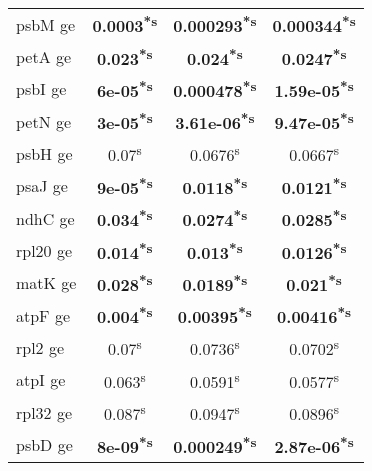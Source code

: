 \documentclass[a4paper]{article}
\begin{document}
\begin{longtable}{l|c|c|c}
psbM ge&\textbf{0.0003\textsuperscript{*}\textsuperscript{s}}&\textbf{0.000293\textsuperscript{*}\textsuperscript{s}}&\textbf{0.000344\textsuperscript{*}\textsuperscript{s}}\\
petA ge&\textbf{0.023\textsuperscript{*}\textsuperscript{s}}&\textbf{0.024\textsuperscript{*}\textsuperscript{s}}&\textbf{0.0247\textsuperscript{*}\textsuperscript{s}}\\
psbI ge&\textbf{6e-05\textsuperscript{*}\textsuperscript{s}}&\textbf{0.000478\textsuperscript{*}\textsuperscript{s}}&\textbf{1.59e-05\textsuperscript{*}\textsuperscript{s}}\\
petN ge&\textbf{3e-05\textsuperscript{*}\textsuperscript{s}}&\textbf{3.61e-06\textsuperscript{*}\textsuperscript{s}}&\textbf{9.47e-05\textsuperscript{*}\textsuperscript{s}}\\
psbH ge&0.07\textsuperscript{s}&0.0676\textsuperscript{s}&0.0667\textsuperscript{s}\\
psaJ ge&\textbf{9e-05\textsuperscript{*}\textsuperscript{s}}&\textbf{0.0118\textsuperscript{*}\textsuperscript{s}}&\textbf{0.0121\textsuperscript{*}\textsuperscript{s}}\\
ndhC ge&\textbf{0.034\textsuperscript{*}\textsuperscript{s}}&\textbf{0.0274\textsuperscript{*}\textsuperscript{s}}&\textbf{0.0285\textsuperscript{*}\textsuperscript{s}}\\
rpl20 ge&\textbf{0.014\textsuperscript{*}\textsuperscript{s}}&\textbf{0.013\textsuperscript{*}\textsuperscript{s}}&\textbf{0.0126\textsuperscript{*}\textsuperscript{s}}\\
matK ge&\textbf{0.028\textsuperscript{*}\textsuperscript{s}}&\textbf{0.0189\textsuperscript{*}\textsuperscript{s}}&\textbf{0.021\textsuperscript{*}\textsuperscript{s}}\\
atpF ge&\textbf{0.004\textsuperscript{*}\textsuperscript{s}}&\textbf{0.00395\textsuperscript{*}\textsuperscript{s}}&\textbf{0.00416\textsuperscript{*}\textsuperscript{s}}\\
rpl2 ge&0.07\textsuperscript{s}&0.0736\textsuperscript{s}&0.0702\textsuperscript{s}\\
atpI ge&0.063\textsuperscript{s}&0.0591\textsuperscript{s}&0.0577\textsuperscript{s}\\
rpl32 ge&0.087\textsuperscript{s}&0.0947\textsuperscript{s}&0.0896\textsuperscript{s}\\
psbD ge&\textbf{8e-09\textsuperscript{*}\textsuperscript{s}}&\textbf{0.000249\textsuperscript{*}\textsuperscript{s}}&\textbf{2.87e-06\textsuperscript{*}\textsuperscript{s}}\\

\end{longtable}
\end{document}
